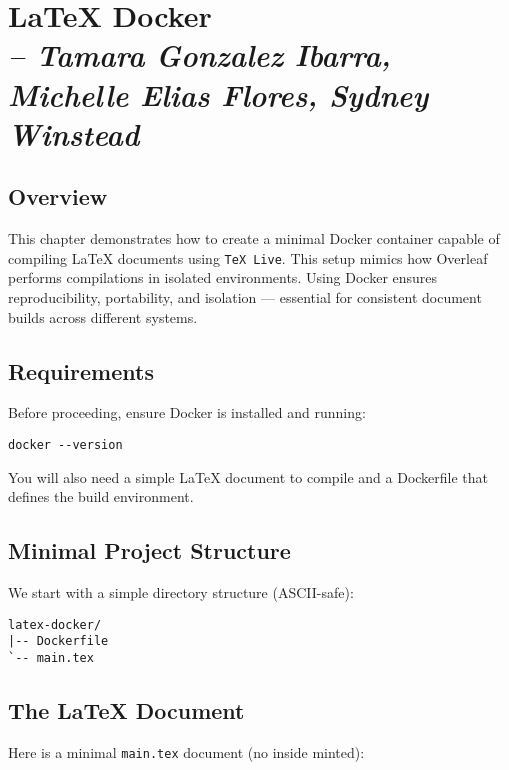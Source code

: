 \chapter{LaTeX Docker \\ 
\small{\textit{-- Tamara Gonzalez Ibarra, Michelle Elias Flores, Sydney Winstead}}}
\label{Chapter::itLaTeXDocker}

\section{Overview}

This chapter demonstrates how to create a minimal Docker container capable of compiling \LaTeX{} documents using \texttt{TeX Live}. This setup mimics how Overleaf performs compilations in isolated environments. Using Docker ensures reproducibility, portability, and isolation — essential for consistent document builds across different systems.

\section{Requirements}

Before proceeding, ensure Docker is installed and running:

\begin{verbatim}
docker --version
\end{verbatim}

You will also need a simple \LaTeX{} document to compile and a Dockerfile that defines the build environment.

\section{Minimal Project Structure}

We start with a simple directory structure (ASCII-safe):

\begin{verbatim}
latex-docker/
|-- Dockerfile
`-- main.tex
\end{verbatim}

\section{The LaTeX Document}

Here is a minimal \texttt{main.tex} document (no \verb|| inside minted):

